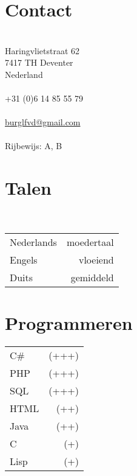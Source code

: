 \documentclass[]{friggeri-cv} %
\begin{document}


\begin{aside} %
\section{Contact}\\
Haringvlietstraat 62\\
7417 TH Deventer\\
Nederland\\
~\\
+31 (0)6 14 85 55 79\\
~\\
\href{mailto:burglfvd@gmail.com}{burglfvd@gmail.com}\\
~\\
Rijbewijs: A, B\\

\section{Talen}\\
\begin{tabular}{l r}
   Nederlands & moedertaal\\
   Engels & vloeiend\\
   Duits & gemiddeld\\
\end{tabular}

\section{Programmeren}
\begin{tabular}{l@{\quad} r}
   C\#  & (+++)\\
   PHP & (+++)\\
   SQL & (+++)\\
   HTML & (++)\\
   Java  & (++)\\
   C & (+)\\
   Lisp & (+)\\
\end{tabular}

\end{aside}
\end{document}
